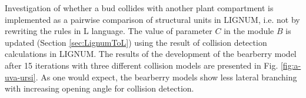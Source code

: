 Investigation of whether a bud collides with another plant compartment
is implemented as a pairwise comparison of structural units in LIGNUM,
i.e.   not  by  rewriting the  rules  in  L  language.  The  value  of
parameter   $C$    in   the    module   $B$   is    updated   (Section
\ref{sec:LignumToL})   using  the   result   of  collision   detection
calculations  in  LIGNUM.   The  results  of the  development  of  the
bearberry  model after  15 iterations  with three  different collision
models  are presented  in  Fig.  \ref{fig:a-uva-ursi}.   As one  would
expect,  the  bearberry  models   show  less  lateral  branching  with
increasing opening angle for collision detection.
 

















